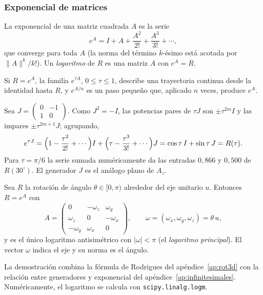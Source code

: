 \subsubsection{Exponencial de matrices}

\begin{definicion}
La exponencial de una matriz cuadrada \(A\) es la serie
\[
  e^A=I+A+\frac{A^2}{2!}+\frac{A^3}{3!}+\cdots,
\]
que converge para toda \(A\) (la norma del término \(k\)-ésimo está acotada por
\(\|A\|^k/k!\)). Un \emph{logaritmo} de \(R\) es una matriz \(A\) con \(e^A=R\).
\end{definicion}

Si \(R=e^A\), la familia \(e^{\tau A}\), \(0\le\tau\le1\), describe una trayectoria continua
desde la identidad hasta \(R\), y \(e^{A/n}\) es un paso pequeño que, aplicado \(n\) veces,
produce \(e^A\).

\begin{ejemplo}
Sea \(J=\left(\begin{smallmatrix}0&-1\\1&0\end{smallmatrix}\right)\). Como \(J^2=-I\), las potencias pares de
\(\tau J\) son \(\pm\tau^{2m}I\) y las impares \(\pm\tau^{2m+1}J\); agrupando,
\[
e^{\tau J}=\Bigl(1-\frac{\tau^2}{2!}+\cdots\Bigr)I+\Bigl(\tau-\frac{\tau^3}{3!}+\cdots\Bigr)J
=\cos\tau\,I+\sin\tau\,J=R(\tau).
\]
Para \(\tau=\pi/6\) la serie sumada numéricamente da las entradas \(0{,}866\) y \(0{,}500\) de
\(R(30^\circ)\). El generador \(J\) es el análogo plano de \(A_z\).
\end{ejemplo}

\begin{proposicion}\label{prop:generador}
Sea \(R\) la rotación de ángulo \(\theta\in[0,\pi)\) alrededor del eje unitario \(u\). Entonces
\(R=e^{A}\) con
\[
A=
\begin{pmatrix}
0&-\omega_z&\omega_y\\
\omega_z&0&-\omega_x\\
-\omega_y&\omega_x&0
\end{pmatrix},
\qquad \omega=(\omega_x,\omega_y,\omega_z)=\theta\,u,
\]
y es el único logaritmo antisimétrico con \(|\omega|<\pi\) (el \emph{logaritmo principal}).
El vector \(\omega\) indica el eje y su norma es el ángulo.
\end{proposicion}

La demostración combina la fórmula de Rodrigues del apéndice~\ref{ap:rot3d} con la relación
entre generadores y exponencial del apéndice~\ref{ap:infinitesimales}. Numéricamente, el
logaritmo se calcula con \texttt{scipy.linalg.logm}.

